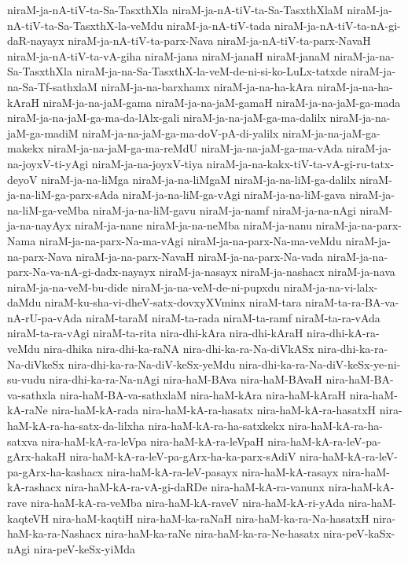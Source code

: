 {niraM-ja-nA-tiV-ta-Sa-TasxthXla
niraM-ja-nA-tiV-ta-Sa-TasxthXlaM
niraM-ja-nA-tiV-ta-Sa-TasxthX-la-veMdu
niraM-ja-nA-tiV-tada
niraM-ja-nA-tiV-ta-nA-gi-daR-nayayx
niraM-ja-nA-tiV-ta-parx-Nava
niraM-ja-nA-tiV-ta-parx-NavaH
niraM-ja-nA-tiV-ta-vA-giha
niraM-jana
niraM-janaH
niraM-janaM
niraM-ja-na-Sa-TasxthXla
niraM-ja-na-Sa-TasxthX-la-veM-de-ni-si-ko-LuLx-tatxde
niraM-ja-na-Sa-Tf-sathxlaM
niraM-ja-na-barxhamx
niraM-ja-na-ha-kAra
niraM-ja-na-ha-kAraH
niraM-ja-na-jaM-gama
niraM-ja-na-jaM-gamaH
niraM-ja-na-jaM-ga-mada
niraM-ja-na-jaM-ga-ma-da-lAlx-gali
niraM-ja-na-jaM-ga-ma-dalilx
niraM-ja-na-jaM-ga-madiM
niraM-ja-na-jaM-ga-ma-doV-pA-di-yalilx
niraM-ja-na-jaM-ga-makekx
niraM-ja-na-jaM-ga-ma-reMdU
niraM-ja-na-jaM-ga-ma-vAda
niraM-ja-na-joyxV-ti-yAgi
niraM-ja-na-joyxV-tiya
niraM-ja-na-kakx-tiV-ta-vA-gi-ru-tatx-deyoV
niraM-ja-na-liMga
niraM-ja-na-liMgaM
niraM-ja-na-liM-ga-dalilx
niraM-ja-na-liM-ga-parx-sAda
niraM-ja-na-liM-ga-vAgi
niraM-ja-na-liM-gava
niraM-ja-na-liM-ga-veMba
niraM-ja-na-liM-gavu
niraM-ja-namf
niraM-ja-na-nAgi
niraM-ja-na-nayAyx
niraM-ja-nane
niraM-ja-na-neMba
niraM-ja-nanu
niraM-ja-na-parx-Nama
niraM-ja-na-parx-Na-ma-vAgi
niraM-ja-na-parx-Na-ma-veMdu
niraM-ja-na-parx-Nava
niraM-ja-na-parx-NavaH
niraM-ja-na-parx-Na-vada
niraM-ja-na-parx-Na-va-nA-gi-dadx-nayayx
niraM-ja-nasayx
niraM-ja-nashacx
niraM-ja-nava
niraM-ja-na-veM-bu-dide
niraM-ja-na-veM-de-ni-pupxdu
niraM-ja-na-vi-lalx-daMdu
niraM-ku-sha-vi-dheV-satx-dovxyXVminx
niraM-tara
niraM-ta-ra-BA-va-nA-rU-pa-vAda
niraM-taraM
niraM-ta-rada
niraM-ta-ramf
niraM-ta-ra-vAda
niraM-ta-ra-vAgi
niraM-ta-rita
nira-dhi-kAra
nira-dhi-kAraH
nira-dhi-kA-ra-veMdu
nira-dhika
nira-dhi-ka-raNA
nira-dhi-ka-ra-Na-diVkASx
nira-dhi-ka-ra-Na-diVkeSx
nira-dhi-ka-ra-Na-diV-keSx-yeMdu
nira-dhi-ka-ra-Na-diV-keSx-ye-ni-su-vudu
nira-dhi-ka-ra-Na-nAgi
nira-haM-BAva
nira-haM-BAvaH
nira-haM-BA-va-sathxla
nira-haM-BA-va-sathxlaM
nira-haM-kAra
nira-haM-kAraH
nira-haM-kA-raNe
nira-haM-kA-rada
nira-haM-kA-ra-hasatx
nira-haM-kA-ra-hasatxH
nira-haM-kA-ra-ha-satx-da-lilxha
nira-haM-kA-ra-ha-satxkekx
nira-haM-kA-ra-ha-satxva
nira-haM-kA-ra-leVpa
nira-haM-kA-ra-leVpaH
nira-haM-kA-ra-leV-pa-gArx-hakaH
nira-haM-kA-ra-leV-pa-gArx-ha-ka-parx-sAdiV
nira-haM-kA-ra-leV-pa-gArx-ha-kashacx
nira-haM-kA-ra-leV-pasayx
nira-haM-kA-rasayx
nira-haM-kA-rashacx
nira-haM-kA-ra-vA-gi-daRDe
nira-haM-kA-ra-vanunx
nira-haM-kA-rave
nira-haM-kA-ra-veMba
nira-haM-kA-raveV
nira-haM-kA-ri-yAda
nira-haM-kaqteVH
nira-haM-kaqtiH
nira-haM-ka-raNaH
nira-haM-ka-ra-Na-hasatxH
nira-haM-ka-ra-Nashacx
nira-haM-ka-raNe
nira-haM-ka-ra-Ne-hasatx
nira-peV-kaSx-nAgi
nira-peV-keSx-yiMda
}
